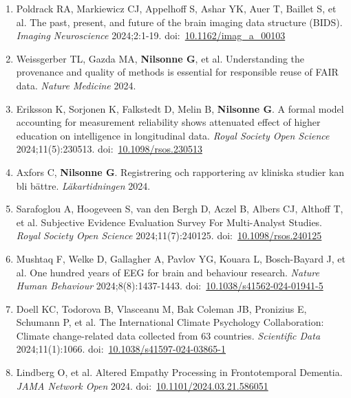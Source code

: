 \documentclass[11pt,a4paper]{article}
\begin{document}
\begin{enumerate}
\item Poldrack RA, Markiewicz CJ, Appelhoff S, Ashar YK, Auer T, Baillet S, et al. The past, present, and future of the brain imaging data structure (BIDS). \textit{Imaging Neuroscience} 2024;2:1-19. doi:~\href{https://doi.org/10.1162/imag_a_00103}{10.1162/imag\_a\_00103}

\item Weissgerber TL, Gazda MA, \textbf{Nilsonne G}, et al. Understanding the provenance and quality of methods is essential for responsible reuse of FAIR data. \textit{Nature Medicine} 2024.

\item Eriksson K, Sorjonen K, Falkstedt D, Melin B, \textbf{Nilsonne G}. A formal model accounting for measurement reliability shows attenuated effect of higher education on intelligence in longitudinal data. \textit{Royal Society Open Science} 2024;11(5):230513. doi:~\href{https://doi.org/10.1098/rsos.230513}{10.1098/rsos.230513}

\item Axfors C, \textbf{Nilsonne G}. Registrering och rapportering av kliniska studier kan bli bättre. \textit{Läkartidningen} 2024.

\item Sarafoglou A, Hoogeveen S, van den Bergh D, Aczel B, Albers CJ, Althoff T, et al. Subjective Evidence Evaluation Survey For Multi-Analyst Studies. \textit{Royal Society Open Science} 2024;11(7):240125. doi:~\href{https://doi.org/10.1098/rsos.240125}{10.1098/rsos.240125}

\item Mushtaq F, Welke D, Gallagher A, Pavlov YG, Kouara L, Bosch-Bayard J, et al. One hundred years of EEG for brain and behaviour research. \textit{Nature Human Behaviour} 2024;8(8):1437-1443. doi:~\href{https://doi.org/10.1038/s41562-024-01941-5}{10.1038/s41562-024-01941-5}

\item Doell KC, Todorova B, Vlasceanu M, Bak Coleman JB, Pronizius E, Schumann P, et al. The International Climate Psychology Collaboration: Climate change-related data collected from 63 countries. \textit{Scientific Data} 2024;11(1):1066. doi:~\href{https://doi.org/10.1038/s41597-024-03865-1}{10.1038/s41597-024-03865-1}

\item Lindberg O, et al. Altered Empathy Processing in Frontotemporal Dementia. \textit{JAMA Network Open} 2024. doi:~\href{https://doi.org/10.1101/2024.03.21.586051}{10.1101/2024.03.21.586051}


\end{enumerate}
\end{document}
